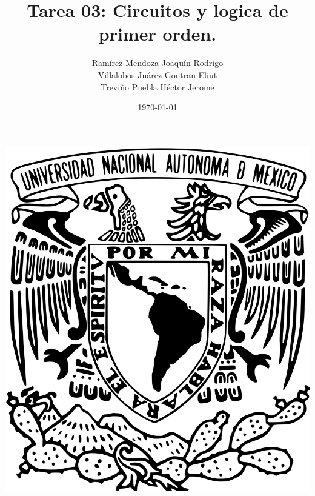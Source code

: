 \documentclass[oneside]{book}
\title{Tarea 03: Circuitos y logica de primer orden.}
\author{Ramírez Mendoza Joaquín Rodrigo\\
Villalobos Juárez Gontran Eliut\\
Treviño Puebla Héctor Jerome}
\date{\today}
\begin{document}
\begin{titlepage}
	\begin{minipage}{3cm}
		\begin{center}
			\includegraphics[height = 0.14\textheight]{recursos/Logo_UNAM.png}\par
		\end{center}
	\end{minipage}\hfill
	\begin{minipage}{10cm}


\end{minipage}
\end{titlepage}
\end{document}
